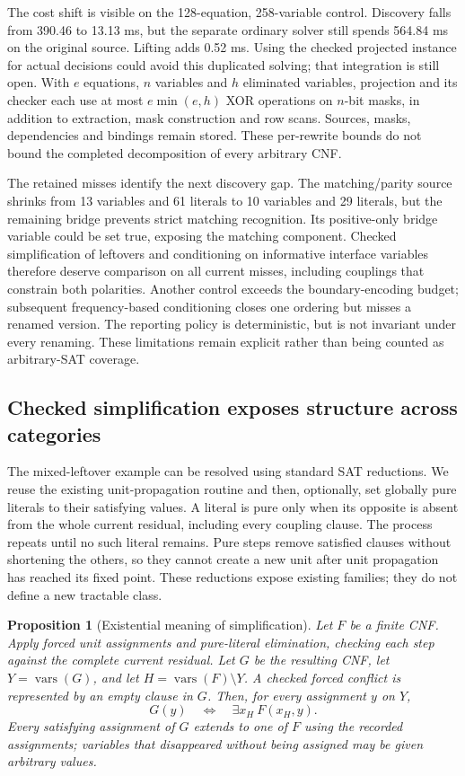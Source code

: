 \documentclass[11pt,a4paper]{article}
\numberwithin{equation}{section}
\theoremstyle{plain}
\newtheorem{proposition}[lemma]{Proposition}
\theoremstyle{definition}
\theoremstyle{remark}
\begin{document}
The cost shift is visible on the 128-equation, 258-variable control. Discovery falls from 390.46 to 13.13 ms, but the separate ordinary solver still spends 564.84 ms on the original source. Lifting adds 0.52 ms. Using the checked projected instance for actual decisions could avoid this duplicated solving; that integration is still open. With $e$ equations, $n$ variables and $h$ eliminated variables, projection and its checker each use at most $e\min(e,h)$ XOR operations on $n$-bit masks, in addition to extraction, mask construction and row scans. Sources, masks, dependencies and bindings remain stored. These per-rewrite bounds do not bound the completed decomposition of every arbitrary CNF.

The retained misses identify the next discovery gap. The matching/parity source shrinks from 13 variables and 61 literals to 10 variables and 29 literals, but the remaining bridge prevents strict matching recognition. Its positive-only bridge variable could be set true, exposing the matching component. Checked simplification of leftovers and conditioning on informative interface variables therefore deserve comparison on all current misses, including couplings that constrain both polarities. Another control exceeds the boundary-encoding budget; subsequent frequency-based conditioning closes one ordering but misses a renamed version. The reporting policy is deterministic, but is not invariant under every renaming. These limitations remain explicit rather than being counted as arbitrary-SAT coverage.

\subsection{Checked simplification exposes structure across categories}
\label{sec:checked-simplification-discovery}

The mixed-leftover example can be resolved using standard SAT reductions. We reuse the existing unit-propagation routine and then, optionally, set globally pure literals to their satisfying values. A literal is pure only when its opposite is absent from the whole current residual, including every coupling clause. The process repeats until no such literal remains. Pure steps remove satisfied clauses without shortening the others, so they cannot create a new unit after unit propagation has reached its fixed point. These reductions expose existing families; they do not define a new tractable class.

\begin{proposition}[Existential meaning of simplification]
\label{prop:simplification-fibers}
Let $F$ be a finite CNF. Apply forced unit assignments and pure-literal elimination, checking each step against the complete current residual. Let $G$ be the resulting CNF, let $Y=\operatorname{vars}(G)$, and let $H=\operatorname{vars}(F)\setminus Y$. A checked forced conflict is represented by an empty clause in $G$. Then, for every assignment $y$ on $Y$,
\[
 G(y)\quad\Longleftrightarrow\quad \exists x_H\ F(x_H,y).
\]
Every satisfying assignment of $G$ extends to one of $F$ using the recorded assignments; variables that disappeared without being assigned may be given arbitrary values.
\end{proposition}
\end{document}
